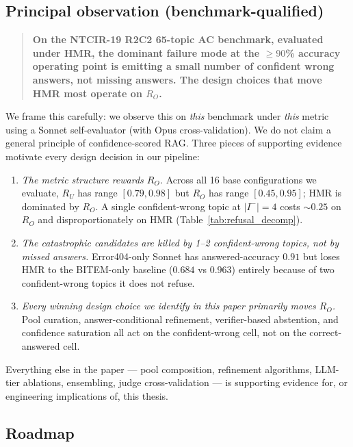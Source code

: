 \documentclass[11pt,a4paper]{article}
\begin{document}
\subsection{Principal observation (benchmark-qualified)}\label{sec:thesis}

\begin{quote}
\textbf{On the NTCIR-19 R2C2 65-topic AC benchmark, evaluated under
HMR, the dominant failure mode at the $\geq 90$\% accuracy operating
point is emitting a small number of confident wrong answers, not
missing answers. The design choices that move HMR most operate on
$R_O$.}
\end{quote}

\noindent We frame this carefully: we observe this on \emph{this}
benchmark under \emph{this} metric using a Sonnet self-evaluator
(with Opus cross-validation). We do not claim a general principle of
confidence-scored RAG. Three pieces of supporting evidence motivate
every design decision in our pipeline:

\begin{enumerate}[leftmargin=*]
  \item \emph{The metric structure rewards $R_O$.} Across all 16 base
    configurations we evaluate, $R_U$ has range $[0.79, 0.98]$ but
    $R_O$ has range $[0.45, 0.95]$; HMR is dominated by $R_O$.
    A single confident-wrong topic at $|I^-|{=}4$ costs $\sim 0.25$
    on $R_O$ and disproportionately on HMR
    (Table~\ref{tab:refusal_decomp}).
  \item \emph{The catastrophic candidates are killed by 1–2
    confident-wrong topics, not by missed answers.} Error404-only
    Sonnet has answered-accuracy $0.91$ but loses HMR to the
    BITEM-only baseline ($0.684$ vs $0.963$) entirely because of
    two confident-wrong topics it does not refuse.
  \item \emph{Every winning design choice we identify in this paper
    primarily moves $R_O$.} Pool curation, answer-conditional
    refinement, verifier-based abstention, and confidence
    saturation all act on the confident-wrong cell, not on the
    correct-answered cell.
\end{enumerate}

\noindent Everything else in the paper — pool composition, refinement
algorithms, LLM-tier ablations, ensembling, judge cross-validation —
is supporting evidence for, or engineering implications of, this
thesis.

\subsection{Roadmap}
\end{document}
